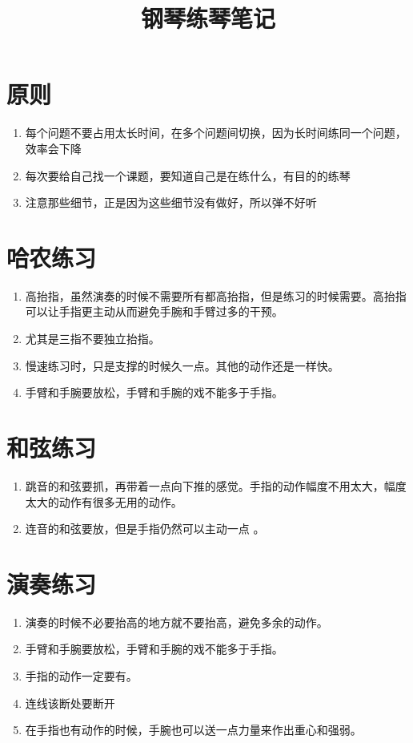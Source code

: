 \documentclass[11pt]{article}
\title{钢琴练琴笔记}
\begin{document}
\maketitle

\section{原则}

\begin{enumerate}
    \item 每个问题不要占用太长时间，在多个问题间切换，因为长时间练同一个问题，效率会下降
    \item 每次要给自己找一个课题，要知道自己是在练什么，有目的的练琴
    \item 注意那些细节，正是因为这些细节没有做好，所以弹不好听
\end{enumerate}

\section{哈农练习}

\begin{enumerate}
    \item 高抬指，虽然演奏的时候不需要所有都高抬指，但是练习的时候需要。高抬指可以让手指更主动从而避免手腕和手臂过多的干预。
    \item 尤其是三指不要独立抬指。
    \item 慢速练习时，只是支撑的时候久一点。其他的动作还是一样快。
    \item 手臂和手腕要放松，手臂和手腕的戏不能多于手指。
\end{enumerate}

\section{和弦练习}

\begin{enumerate}
    \item 跳音的和弦要抓，再带着一点向下推的感觉。手指的动作幅度不用太大，幅度太大的动作有很多无用的动作。 
    \item 连音的和弦要放，但是手指仍然可以主动一点 。
\end{enumerate}

\section{演奏练习}

\begin{enumerate}
    \item 演奏的时候不必要抬高的地方就不要抬高，避免多余的动作。 
    \item 手臂和手腕要放松，手臂和手腕的戏不能多于手指。
    \item 手指的动作一定要有。
    \item 连线该断处要断开
    \item 在手指也有动作的时候，手腕也可以送一点力量来作出重心和强弱。
\end{enumerate}
\end{document}

